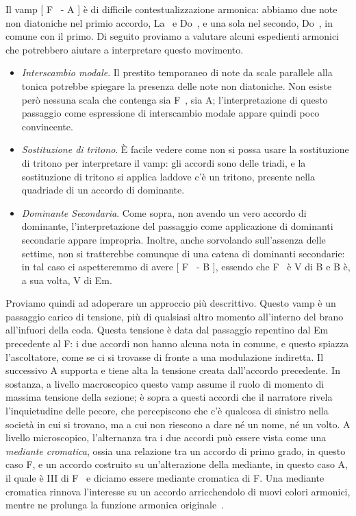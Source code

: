 \documentclass[class=book, crop=false, oneside, 12pt]{standalone}
\begin{document}
    Il vamp [ F\sharp~ - A ] è  di difficile contestualizzazione armonica: abbiamo due note non diatoniche nel primio accordo, La\sharp~ e Do\sharp~, e una sola nel secondo, Do\sharp~, in comune con il primo. Di seguito proviamo a valutare alcuni espedienti armonici che potrebbero aiutare a interpretare questo movimento.
    \begin{itemize}
        \item \emph{Interscambio modale}. Il prestito temporaneo di note da scale parallele alla tonica potrebbe spiegare la presenza delle note non diatoniche. Non esiste però nessuna scala che contenga sia F\sharp~, sia A; l'interpretazione di questo passaggio come espressione di interscambio modale appare quindi poco convincente.
        \item \emph{Sostituzione di tritono}. È facile vedere come non si possa usare la sostituzione di tritono per interpretare il vamp: gli accordi sono delle triadi, e la sostituzione di tritono si applica laddove c'è un tritono, presente nella quadriade di un accordo di dominante.
        \item \emph{Dominante Secondaria}. Come sopra, non avendo un vero accordo di dominante, l'interpretazione del passaggio come applicazione di dominanti secondarie appare impropria. Inoltre, anche sorvolando sull'assenza delle settime, non si tratterebbe comunque di una catena di dominanti secondarie: in tal caso ci aspetteremmo di avere [ F\sharp~ - B ], essendo che F\sharp~ è V di B e B è, a sua volta, V di Em.
    \end{itemize}
    
    Proviamo quindi ad adoperare un approccio più descrittivo. Questo vamp è un passaggio carico di tensione, più di qualsiasi altro momento all'interno del brano all'infuori della coda. Questa tensione è data dal passaggio repentino dal Em precedente al F\sharp : i due accordi non hanno alcuna nota in comune, e questo spiazza l'ascoltatore, come se ci si trovasse di fronte a una modulazione indiretta. Il successivo A supporta e tiene alta la tensione creata dall'accordo precedente. In sostanza, a livello macroscopico questo vamp assume il ruolo di momento di massima tensione della sezione; è sopra a questi accordi che il narratore rivela l'inquietudine delle pecore, che percepiscono che c'è qualcosa di sinistro nella società in cui si trovano, ma a cui non riescono a dare né un nome, né un volto. A livello microscopico, l'alternanza tra i due accordi può essere vista come una \emph{mediante cromatica}, ossia una relazione tra un accordo di primo grado, in questo caso F\sharp, e un accordo costruito su un'alterazione della mediante,  in questo caso A, il quale è \flat III di F\sharp~ e diciamo essere mediante cromatica di F\sharp. Una mediante cromatica rinnova l'interesse su un accordo arricchendolo di nuovi colori armonici, mentre ne prolunga la funzione armonica originale~\cite[12.2, p. 202]{benward2014music}.
\end{document}
